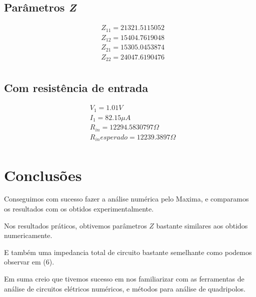\documentclass[12pt,twoside, a4paper, twocolumn]{article}
\begin{document}
\pagebreak


\subsection{Parâmetros \emph{Z}}


\begin{equation}
    \begin{aligned}
         & Z_{11} = 21321.5115052 \\
         & Z_{12} = 15404.7619048 \\
         & Z_{21} = 15305.0453874 \\
         & Z_{22} = 24047.6190476 \\
    \end{aligned}
\end{equation}




\subsection{Com resistência de entrada}


\begin{equation}
    \begin{aligned}
         & V_1 = 1.01 V                           \\
         & I_1 = 82.15 \mu A                      \\
         & R_{in} = 12294.5830797 \varOmega       \\
         & R_{in} esperado = 12239.3897 \varOmega \\
    \end{aligned}
\end{equation}




\section{Conclusões}




Conseguimos com sucesso fazer a análise numérica pelo Maxima, e comparamos os resultados com os obtidos experimentalmente.




Nos resultados práticos, obtivemos parâmetros $Z$ bastante similares aos obtidos numericamente.


E também uma impedancia total de circuito bastante semelhante como podemos observar em (6).


Em suma creio que tivemos sucesso em nos familiarizar com as ferramentas de análise de circuitos elétricos numéricos, e métodos para análise de quadripolos.
\end{document}
